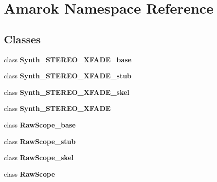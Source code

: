\section{Amarok Namespace Reference}
\label{namespaceAmarok}




\subsection*{Classes}
\begin{CompactItemize}
\item 
class {\bf Synth\_\-STEREO\_\-XFADE\_\-base}
\item 
class {\bf Synth\_\-STEREO\_\-XFADE\_\-stub}
\item 
class {\bf Synth\_\-STEREO\_\-XFADE\_\-skel}
\item 
class {\bf Synth\_\-STEREO\_\-XFADE}
\item 
class {\bf Raw\-Scope\_\-base}
\item 
class {\bf Raw\-Scope\_\-stub}
\item 
class {\bf Raw\-Scope\_\-skel}
\item 
class {\bf Raw\-Scope}
\end{CompactItemize}
